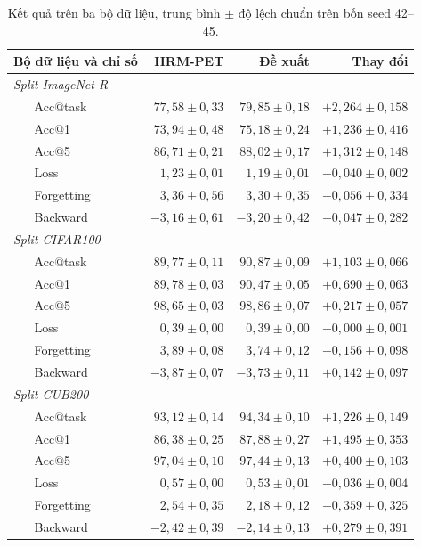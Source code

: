 \documentclass[runningheads]{llncs}
\begin{document}
\begin{table}
\caption{Kết quả trên ba bộ dữ liệu, trung bình $\pm$ độ lệch chuẩn trên bốn
seed 42--45.}\label{tab:main}
\begin{tabular}{llrrr}
\hline
\multicolumn{2}{l}{Bộ dữ liệu và chỉ số} & HRM-PET & Đề xuất & Thay đổi\\
\hline
\multicolumn{5}{l}{\emph{Split-ImageNet-R}}\\
& Acc@task   & $77{,}58 \pm 0{,}33$ & $79{,}85 \pm 0{,}18$ & $+2{,}264 \pm 0{,}158$\\
& Acc@1      & $73{,}94 \pm 0{,}48$ & $75{,}18 \pm 0{,}24$ & $+1{,}236 \pm 0{,}416$\\
& Acc@5      & $86{,}71 \pm 0{,}21$ & $88{,}02 \pm 0{,}17$ & $+1{,}312 \pm 0{,}148$\\
& Loss       & $1{,}23 \pm 0{,}01$  & $1{,}19 \pm 0{,}01$  & $-0{,}040 \pm 0{,}002$\\
& Forgetting & $3{,}36 \pm 0{,}56$  & $3{,}30 \pm 0{,}35$  & $-0{,}056 \pm 0{,}334$\\
& Backward   & $-3{,}16 \pm 0{,}61$ & $-3{,}20 \pm 0{,}42$ & $-0{,}047 \pm 0{,}282$\\
\multicolumn{5}{l}{\emph{Split-CIFAR100}}\\
& Acc@task   & $89{,}77 \pm 0{,}11$ & $90{,}87 \pm 0{,}09$ & $+1{,}103 \pm 0{,}066$\\
& Acc@1      & $89{,}78 \pm 0{,}03$ & $90{,}47 \pm 0{,}05$ & $+0{,}690 \pm 0{,}063$\\
& Acc@5      & $98{,}65 \pm 0{,}03$ & $98{,}86 \pm 0{,}07$ & $+0{,}217 \pm 0{,}057$\\
& Loss       & $0{,}39 \pm 0{,}00$  & $0{,}39 \pm 0{,}00$  & $-0{,}000 \pm 0{,}001$\\
& Forgetting & $3{,}89 \pm 0{,}08$  & $3{,}74 \pm 0{,}12$  & $-0{,}156 \pm 0{,}098$\\
& Backward   & $-3{,}87 \pm 0{,}07$ & $-3{,}73 \pm 0{,}11$ & $+0{,}142 \pm 0{,}097$\\
\multicolumn{5}{l}{\emph{Split-CUB200}}\\
& Acc@task   & $93{,}12 \pm 0{,}14$ & $94{,}34 \pm 0{,}10$ & $+1{,}226 \pm 0{,}149$\\
& Acc@1      & $86{,}38 \pm 0{,}25$ & $87{,}88 \pm 0{,}27$ & $+1{,}495 \pm 0{,}353$\\
& Acc@5      & $97{,}04 \pm 0{,}10$ & $97{,}44 \pm 0{,}13$ & $+0{,}400 \pm 0{,}103$\\
& Loss       & $0{,}57 \pm 0{,}00$  & $0{,}53 \pm 0{,}01$  & $-0{,}036 \pm 0{,}004$\\
& Forgetting & $2{,}54 \pm 0{,}35$  & $2{,}18 \pm 0{,}12$  & $-0{,}359 \pm 0{,}325$\\
& Backward   & $-2{,}42 \pm 0{,}39$ & $-2{,}14 \pm 0{,}13$ & $+0{,}279 \pm 0{,}391$\\
\hline
\end{tabular}
\end{table}
\end{document}
